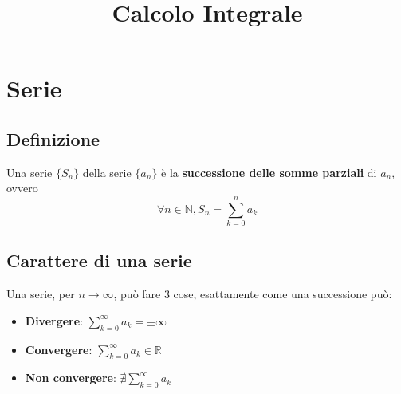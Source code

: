 \documentclass{article}
\begin{document}
\title{Calcolo Integrale}
\maketitle
\section{Serie}
    \subsection{Definizione}
        Una serie $\{S_n\}$ della serie $\{a_n\}$ è la \textbf{successione delle somme parziali} 
        di $a_n$, ovvero 
        $$\forall n \in \mathbb{N}, S_n = \sum_{k=0}^n a_k$$
    \subsection{Carattere di una serie}
        Una serie, per $n \to \infty$, può fare 3 cose, esattamente come una successione può:
        \begin{itemize}
            \item \textbf{Divergere}: $\sum_{k=0}^\infty a_k = \pm \infty$
            \item \textbf{Convergere}: $\sum_{k=0}^\infty a_k \in \mathbb{R}$
            \item \textbf{Non convergere}: $\nexists \sum_{k=0}^\infty a_k$
        \end{itemize}
\end{document}
